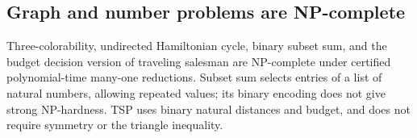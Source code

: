 \begin{result}
\subsection{Graph and number problems are NP-complete}
Three-colorability, undirected Hamiltonian cycle, binary subset sum, and the
budget decision version of traveling salesman are NP-complete under certified
polynomial-time many-one reductions. Subset sum selects entries of a list of
natural numbers, allowing repeated values; its binary encoding does not give
strong NP-hardness. TSP uses binary natural distances and budget, and does not
require symmetry or the triangle inequality.\citep{Karp1972,GareyJohnson1979,Sipser2013}
\end{result}

